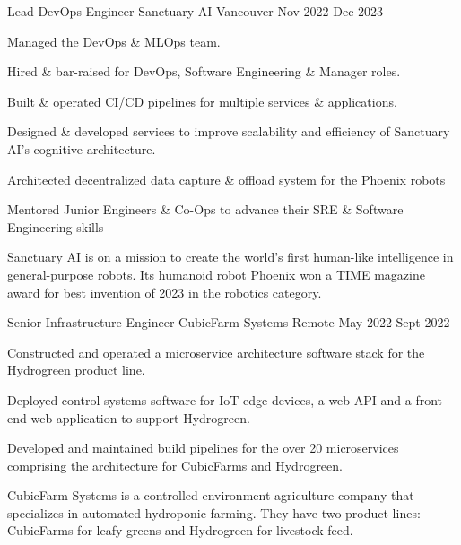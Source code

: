 

\begin{cventries}

  \cventrywithsummary
    {Lead DevOps Engineer} %
    {Sanctuary AI} %
    {Vancouver} %
    {Nov 2022-Dec 2023} %
    {
      \begin{cvitems} %
        \item {Managed the DevOps \& MLOps team.}
        \item {Hired \& bar-raised for DevOps, Software Engineering \& Manager roles.}
        \item {Built \& operated CI/CD pipelines for multiple services \& applications.}
        \item {Designed \& developed services to improve scalability and efficiency of Sanctuary AI's cognitive architecture.}
        \item {Architected decentralized data capture \& offload system for the Phoenix robots}
        \item {Mentored Junior Engineers \& Co-Ops to advance their SRE \& Software Engineering skills}
      \end{cvitems}
    }
    {
      Sanctuary AI is on a mission to create the world's first human-like intelligence in general-purpose robots.
      Its humanoid robot Phoenix won a TIME magazine award for best invention of 2023 in the robotics category.
    }

  \cventrywithsummary
    {Senior Infrastructure Engineer} %
    {CubicFarm Systems} %
    {Remote} %
    {May 2022-Sept 2022} %
    {
      \begin{cvitems} %
        \item {Constructed and operated a microservice architecture software stack for the Hydrogreen product line.}
        \item {Deployed control systems software for IoT edge devices, a web API and a front-end web application to support Hydrogreen.}
        \item {Developed and maintained build pipelines for the over 20 microservices comprising the architecture for CubicFarms and Hydrogreen.}
      \end{cvitems}
    }
    {
      CubicFarm Systems is a controlled-environment agriculture company that specializes in automated hydroponic farming.
      They have two product lines: CubicFarms for leafy greens and Hydrogreen for livestock feed.
    }


\end{cventries}
